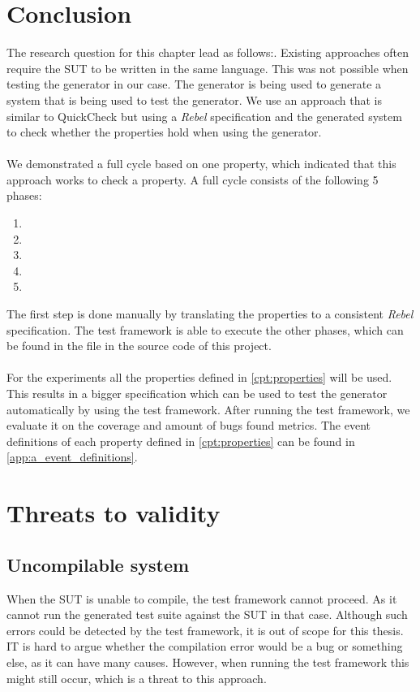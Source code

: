 \section{Conclusion}
The research question for this chapter lead as follows:\rqTwo{}. Existing approaches often require the SUT to be written in the same language. This was not possible when testing the generator in our case. The generator is being used to generate a system that is being used to test the generator. We use an approach that is similar to QuickCheck but using a \textit{Rebel} specification and the generated system to check whether the properties hold when using the generator.\\
\\
We demonstrated a full cycle based on one property, which indicated that this approach works to check a property. A full cycle consists of the following 5 phases:
\begin{enumerate}
\item \tfPhaseOne{}
\item \tfPhaseTwo{}
\item \tfPhaseThree{}
\item \tfPhaseFour{}
\item \tfPhaseFive{}
\end{enumerate}
The first step is done manually by translating the properties to a consistent \textit{Rebel} specification. The test framework is able to execute the other phases, which can be found in the  file in the source code of this project.\\
\\
For the experiments all the properties defined in \autoref{cpt:properties} will be used. This results in a bigger specification which can be used to test the generator automatically by using the test framework. After running the test framework, we evaluate it on the coverage and amount of bugs found metrics. The event definitions of each property defined in \autoref{cpt:properties} can be found in \autoref{app:a_event_definitions}.

\section{Threats to validity}

\subsection*{Uncompilable system}
When the SUT is unable to compile, the test framework cannot proceed. As it cannot run the generated test suite against the SUT in that case. Although such errors could be detected by the test framework, it is out of scope for this thesis. IT is hard to argue whether the compilation error would be a bug or something else, as it can have many causes. However, when running the test framework this might still occur, which is a threat to this approach.

